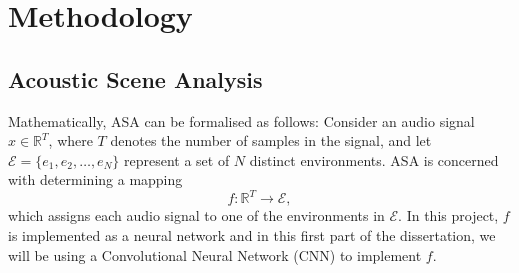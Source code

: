 \documentclass[logo,bsc,singlespacing,parskip,online]{infthesis}
\begin{document}


\chapter{Methodology}



\section{Acoustic Scene Analysis}
\label{sec:methodology-asa}
Mathematically, ASA can be formalised as follows:
Consider an audio signal \(x \in \mathbb{R}^{T}\), where \(T\) denotes the number of samples in the signal, and let \(\mathcal{E} = \{e_1, e_2, \ldots, e_N\}\) represent a set of \(N\) distinct environments. ASA is concerned with determining a mapping 
\[
f: \mathbb{R}^{T} \rightarrow \mathcal{E},
\]
which assigns each audio signal to one of the environments in \(\mathcal{E}\). In this project, \(f\) is implemented as a neural network
and in this first part of the dissertation, we will be using a Convolutional Neural Network (CNN) to implement \(f\).
\end{document}
